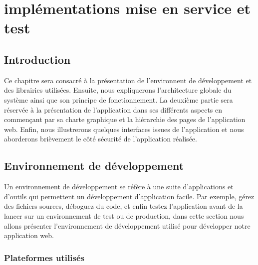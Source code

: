 \chapter{implémentations mise en service et test}
\renewcommand{\headrulewidth}{1pt}


\section{Introduction}
Ce chapitre sera consacré à la présentation de l’environnent de développement 
et des librairies utilisées. Ensuite, nous expliquerons l’architecture globale 
du système ainsi que son principe de fonctionnement. La deuxième partie sera 
réservée à la présentation de l’application dans ses différents aspects en 
commençant par sa charte graphique et la hiérarchie des pages de l’application 
web. Enfin, nous illustrerons quelques interfaces issues de l’application et 
nous aborderons brièvement le côté sécurité de l’application réalisée.   

\section{Environnement de développement}
Un environnement de développement se réfère à une suite d’applications et 
d’outils qui permettent un développement d’application facile. Par exemple, 
gérez des fichiers sources, déboguez du code, et enfin testez l’application 
avant de la lancer sur un environnement de test ou de production, dans cette 
section nous allons présenter l’environnement de développement utilisé pour 
développer notre application web.
    
\subsection{Plateformes utilisés}

